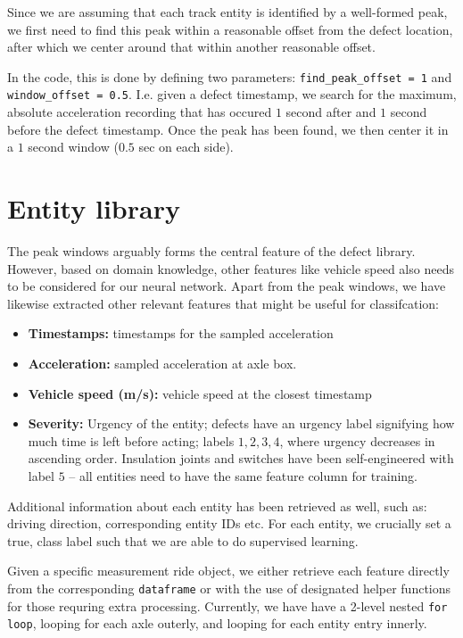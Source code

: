 Since we are assuming that each track entity is identified by a well-formed peak, we first need to find this peak within a reasonable offset from the defect location, after which we center around that within another reasonable offset. 

In the code, this is done by defining two parameters: \verb|find_peak_offset = 1| and \verb|window_offset = 0.5|. I.e. given a defect timestamp, we search for the maximum, absolute acceleration recording that has occured $1$ second after and $1$ second before the defect timestamp. Once the peak has been found, we then center it in a $1$ second window ($0.5$ sec on each side).


\section{Entity library}
The peak windows arguably forms the central feature of the defect library. However, based on domain knowledge, other features like vehicle speed also needs to be considered for our neural network. Apart from the peak windows, we have likewise extracted other relevant features that might be useful for classifcation:
\begin{itemize}
	\item \textbf{Timestamps:} timestamps for the sampled acceleration
	\item \textbf{Acceleration:} sampled acceleration at axle box.
	\item \textbf{Vehicle speed (m/s):} vehicle speed at the closest timestamp
	\item \textbf{Severity:} Urgency of the entity; defects have an urgency label signifying how much time is left before acting; labels $1,2,3,4$, where urgency decreases in ascending order. Insulation joints and switches have been self-engineered with label $5$ -- all entities need to have the same feature column for training.
\end{itemize}
Additional information about each entity has been retrieved as well, such as: driving direction, corresponding entity IDs etc. For each entity, we crucially set a true, class label such that we are able to do supervised learning.

Given a specific measurement ride object, we either retrieve each feature directly from the corresponding \verb|dataframe| or with the use of designated helper functions for those requring extra processing. Currently, we have have a 2-level nested \verb|for loop|, looping for each axle outerly, and looping for each entity entry innerly.

